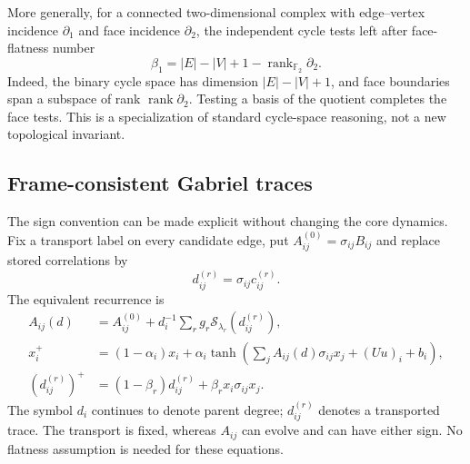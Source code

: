 \documentclass[11pt,a4paper]{article}
\theoremstyle{definition}\newtheorem{definition}[theorem]{Definition}
\newcommand{\soft}{\mathcal{S}}
\begin{document}
More generally, for a connected two-dimensional complex with edge--vertex incidence $\partial_1$ and face incidence $\partial_2$, the independent cycle tests left after face-flatness number
\begin{equation}
 \beta_1=|E|-|V|+1-\operatorname{rank}_{\mathbb F_2}\partial_2.
 \label{eq:remainingcycles}
\end{equation}
Indeed, the binary cycle space has dimension $|E|-|V|+1$, and face boundaries span a subspace of rank $\operatorname{rank}\partial_2$. Testing a basis of the quotient completes the face tests. This is a specialization of standard cycle-space reasoning, not a new topological invariant.

\subsection{Frame-consistent Gabriel traces}\label{sec:transporttrace}
The sign convention can be made explicit without changing the core dynamics. Fix a transport label on every candidate edge, put $A^{(0)}_{ij}=\sigma_{ij}B_{ij}$ and replace stored correlations by
\begin{equation}
 d^{(r)}_{ij}=\sigma_{ij}c^{(r)}_{ij}.
\end{equation}
The equivalent recurrence is
\begin{align}
 A_{ij}(d)&=A^{(0)}_{ij}+d_i^{-1}\sum_r g_r\soft_{\lambda_r}(d^{(r)}_{ij}),\\
 x_i^+&=(1-\alpha_i)x_i+\alpha_i\tanh\!\left(
       \sum_j A_{ij}(d)\sigma_{ij}x_j+(Uu)_i+b_i\right),\label{eq:orientedactivity}\\
 (d^{(r)}_{ij})^+&=(1-\beta_r)d^{(r)}_{ij}
                  +\beta_r x_i\sigma_{ij}x_j.\label{eq:orientedtrace}
\end{align}
The symbol $d_i$ continues to denote parent degree; $d^{(r)}_{ij}$ denotes a transported trace. The transport is fixed, whereas $A_{ij}$ can evolve and can have either sign. No flatness assumption is needed for these equations.
\end{document}
